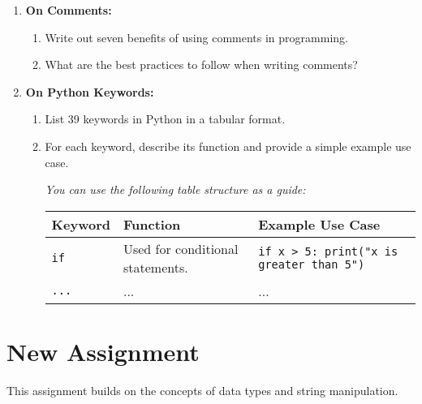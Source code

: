\begin{enumerate}
    \item \textbf{On Comments:}
    \begin{enumerate}
        \item Write out seven benefits of using comments in programming.
        \item What are the best practices to follow when writing comments?
    \end{enumerate}

    \item \textbf{On Python Keywords:}
    \begin{enumerate}
        \item List 39 keywords in Python in a tabular format.
        \item For each keyword, describe its function and provide a simple example use case.
        
        \vspace{0.5em}
        \textit{You can use the following table structure as a guide:}
        \begin{center}
            \begin{tabular}{| m{2cm} | m{5cm} | m{5cm} |}
                \hline
                \textbf{Keyword} & \textbf{Function} & \textbf{Example Use Case} \\
                \hline
                \texttt{if} & Used for conditional statements. & \texttt{if x > 5: print("x is greater than 5")}\\
                \hline
                \texttt{...} & ... & ... \\
                \hline
            \end{tabular}
        \end{center}
    \end{enumerate}
\end{enumerate}

\vspace{1em}
\hrulefill
\vspace{1em}

\section{New Assignment}

This assignment builds on the concepts of data types and string manipulation.


